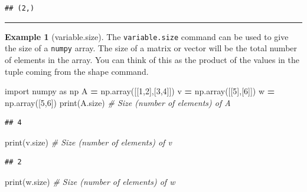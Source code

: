 \documentclass[
]{book}
\newenvironment{Shaded}{\begin{snugshade}}{\end{snugshade}}
\newcommand{\BuiltInTok}[1]{#1}
\newcommand{\CommentTok}[1]{\textcolor[rgb]{0.56,0.35,0.01}{\textit{#1}}}
\newcommand{\DecValTok}[1]{\textcolor[rgb]{0.00,0.00,0.81}{#1}}
\newcommand{\ImportTok}[1]{#1}
\newcommand{\NormalTok}[1]{#1}
\newcommand{\OperatorTok}[1]{\textcolor[rgb]{0.81,0.36,0.00}{\textbf{#1}}}
\theoremstyle{definition}
\theoremstyle{definition}
\newtheorem{example}{Example}[chapter]
\theoremstyle{definition}
\theoremstyle{remark}
\begin{document}
\begin{verbatim}
## (2,)
\end{verbatim}

\begin{center}\rule{0.5\linewidth}{0.5pt}\end{center}

\begin{example}[variable.size]
\protect\hypertarget{exm:unnamed-chunk-716}{}{\label{exm:unnamed-chunk-716} {} }The \texttt{variable.size} command can be used to give the size of a \texttt{numpy} array. The size of a matrix or vector will be the total number of elements in the array. You can think of this as the product of the values in the tuple coming from the shape command.
\end{example}

\begin{Shaded}
\begin{Highlighting}[]
\ImportTok{import}\NormalTok{ numpy }\ImportTok{as}\NormalTok{ np}
\NormalTok{A }\OperatorTok{=}\NormalTok{ np.array([[}\DecValTok{1}\NormalTok{,}\DecValTok{2}\NormalTok{],[}\DecValTok{3}\NormalTok{,}\DecValTok{4}\NormalTok{]])}
\NormalTok{v }\OperatorTok{=}\NormalTok{ np.array([[}\DecValTok{5}\NormalTok{],[}\DecValTok{6}\NormalTok{]])}
\NormalTok{w }\OperatorTok{=}\NormalTok{ np.array([}\DecValTok{5}\NormalTok{,}\DecValTok{6}\NormalTok{])}
\BuiltInTok{print}\NormalTok{(A.size) }\CommentTok{\# Size (number of elements) of A}
\end{Highlighting}
\end{Shaded}

\begin{verbatim}
## 4
\end{verbatim}

\begin{Shaded}
\begin{Highlighting}[]
\BuiltInTok{print}\NormalTok{(v.size) }\CommentTok{\# Size (number of elements) of v}
\end{Highlighting}
\end{Shaded}

\begin{verbatim}
## 2
\end{verbatim}

\begin{Shaded}
\begin{Highlighting}[]
\BuiltInTok{print}\NormalTok{(w.size) }\CommentTok{\# Size (number of elements) of w}
\end{Highlighting}
\end{Shaded}
\end{document}
